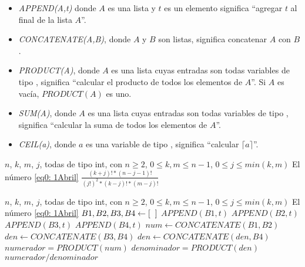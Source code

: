 \begin{itemize}
	\item \textit{APPEND(A,t)} donde $A$ es una lista y $t$ es un elemento
	significa ``agregar $t$ al final de la lista $A$''.
	\item \textit{CONCATENATE(A,B)}, donde $A$ y $B$ son listas, significa
	concatenar $A$ con $B$.
	\item \textit{PRODUCT(A)}, donde $A$ es una lista cuyas entradas
	son todas variables de tipo , significa ``calcular el producto
	de todos los elementos de $A$''. Si $A$ es vacía, $PRODUCT(A)$ es uno.
	\item \textit{SUM(A)}, donde $A$ es una lista cuyas entradas
	son todas variables de tipo , significa ``calcular la suma
	de todos los elementos de $A$''. 
	\item \textit{CEIL(a)}, donde $a$ es una variable de tipo , significa
	``calcular $\lceil a \rceil$''.
\end{itemize}

\begin{algorithm}
\caption{$sumandoV1$}\label{alg: sumandoV1}
\begin{algorithmic} [1]
\REQUIRE $n$, $k$, $m$, $j$, todas de tipo int, con $n \geq 2$, 
$0 \leq k, m \leq n-1$, $0 \leq j \leq min(k,m)$
\ENSURE El número \eqref{eq0: 1Abril}
\RETURN $\frac{(k+j)! * (n-j-1)! }{(j!)^{2}* (k-j)! * (m-j)!}$
\end{algorithmic}
\end{algorithm}

\begin{algorithm}
\caption{$sumandoV2$}\label{alg: sumandoV2}
\begin{algorithmic} [1]
\REQUIRE $n$, $k$, $m$, $j$, todas de tipo int, con $n \geq 2$, 
$0 \leq k, m \leq n-1$, $0 \leq j \leq min(k,m)$
\ENSURE El número \eqref{eq0: 1Abril}
\STATE $B1, B2, B3, B4 \leftarrow [\hspace{0.2cm}]$
\STATE $APPEND(B1, t)$
\ENDFOR
{} 
\STATE $APPEND(B2, t)$
\ENDFOR
{} 
\STATE $APPEND(B3, t)$
\ENDFOR
{} 
\STATE $APPEND(B4, t)$
\ENDFOR
\STATE $num \leftarrow CONCATENATE(B1, B2)$
\STATE $den \leftarrow CONCATENATE(B3, B4)$
\STATE $den \leftarrow CONCATENATE(den, B4)$
\STATE $numerador = PRODUCT(num)$
\STATE $denominador = PRODUCT(den)$
\RETURN $numerador/denominador$
\end{algorithmic}
\end{algorithm}



